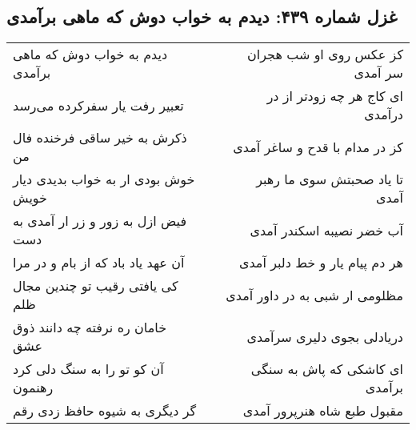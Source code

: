 \begin{center}
\section*{غزل شماره ۴۳۹: دیدم به خواب دوش که ماهی برآمدی}
\label{sec:sh439}
\begin{longtable}{l p{0.5cm} r}
دیدم به خواب دوش که ماهی برآمدی
&&
کز عکس روی او شب هجران سر آمدی
\\
تعبیر رفت یار سفرکرده می‌رسد
&&
ای کاج هر چه زودتر از در درآمدی
\\
ذکرش به خیر ساقی فرخنده فال من
&&
کز در مدام با قدح و ساغر آمدی
\\
خوش بودی ار به خواب بدیدی دیار خویش
&&
تا یاد صحبتش سوی ما رهبر آمدی
\\
فیض ازل به زور و زر ار آمدی به دست
&&
آب خضر نصیبه اسکندر آمدی
\\
آن عهد یاد باد که از بام و در مرا
&&
هر دم پیام یار و خط دلبر آمدی
\\
کی یافتی رقیب تو چندین مجال ظلم
&&
مظلومی ار شبی به در داور آمدی
\\
خامان ره نرفته چه دانند ذوق عشق
&&
دریادلی بجوی دلیری سرآمدی
\\
آن کو تو را به سنگ دلی کرد رهنمون
&&
ای کاشکی که پاش به سنگی برآمدی
\\
گر دیگری به شیوه حافظ زدی رقم
&&
مقبول طبع شاه هنرپرور آمدی
\\
\end{longtable}
\end{center}
